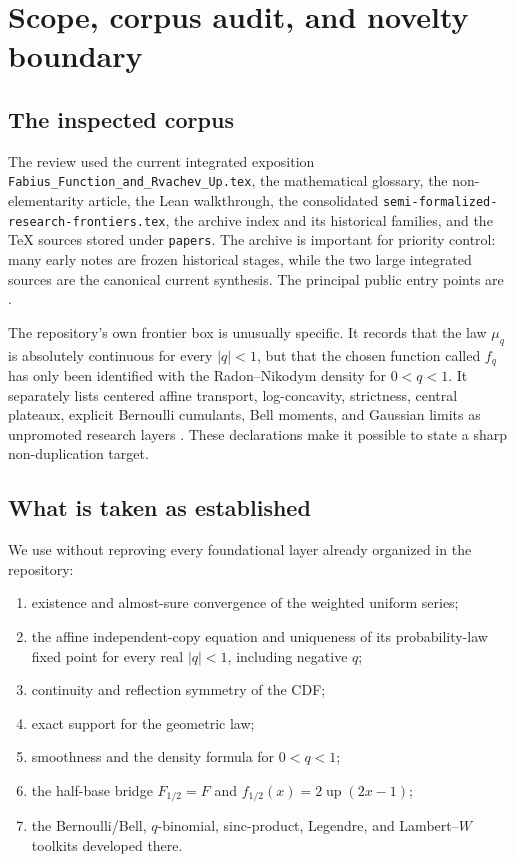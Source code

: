 \documentclass[11pt]{article}
\theoremstyle{definition}
\newcommand{\Up}{\operatorname{up}}
\begin{document}
\tableofcontents
\newpage

\section{Scope, corpus audit, and novelty boundary}

\subsection{The inspected corpus}

The review used the current integrated exposition
\texttt{Fabius\_Function\_and\_Rvachev\_Up.tex}, the mathematical glossary, the
non-elementarity article, the Lean walkthrough, the consolidated
\texttt{semi-formalized-research-frontiers.tex}, the archive index and its historical
families, and the TeX sources stored under \texttt{papers}.  The archive is important
for priority control: many early notes are frozen historical stages, while the two large
integrated sources are the canonical current synthesis.  The principal public entry
points are \cite{repo-main,repo-frontiers,repo-glossary,repo-nonelem,repo-leanwalk}.

The repository's own frontier box is unusually specific.  It records that the law
\(\mu_q\) is absolutely continuous for every \(\lvert q\rvert<1\), but that the chosen
function called \(f_q\) has only been identified with the Radon--Nikodym density for
\(0<q<1\).  It separately lists centered affine transport, log-concavity, strictness,
central plateaux, explicit Bernoulli cumulants, Bell moments, and Gaussian limits as
unpromoted research layers \cite{repo-frontiers}.  These declarations make it possible
to state a sharp non-duplication target.

\subsection{What is taken as established}

We use without reproving every foundational layer already organized in the repository:

\begin{enumerate}[label=(\roman*),leftmargin=2.2em]
\item existence and almost-sure convergence of the weighted uniform series;
\item the affine independent-copy equation and uniqueness of its probability-law fixed
      point for every real \(\lvert q\rvert<1\), including negative \(q\);
\item continuity and reflection symmetry of the CDF;
\item exact support for the geometric law;
\item smoothness and the density formula for \(0<q<1\);
\item the half-base bridge
      \(F_{1/2}=F\) and \(f_{1/2}(x)=2\Up(2x-1)\);
\item the Bernoulli/Bell, $q$-binomial, sinc-product, Legendre, and Lambert--\(W\)
      toolkits developed there.
\end{enumerate}
\end{document}
